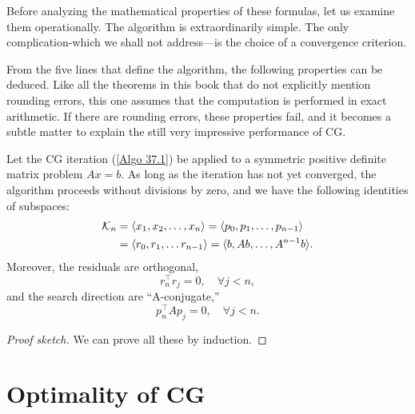 Before analyzing the mathematical properties of these formulas, let us examine them operationally. The algorithm is extraordinarily simple. The only complication-which we shall not address—is the choice of a convergence criterion.

From the five lines that define the algorithm, the following properties can be deduced. Like all the theorems in this book that do not explicitly mention rounding errors, this one assumes that the computation is performed in exact arithmetic. If there are rounding errors, these properties fail, and it becomes a subtle matter to explain the still very impressive performance of CG.


\begin{theorem}
[Properties of CG]
\label{thm: Properties of CG}
Let the CG  iteration (\autoref{Algo 37.1}) be applied to a symmetric positive definite matrix problem $ Ax=b $. As long as the iteration has not yet converged, the algorithm proceeds without divisions by zero, and we have the following identities of subspaces: 
\begin{equation}
\label{eq: subspaces of CG}
    \begin{aligned}
        \mathcal{K}_n &= \langle x_1,x_2,\ldots ,x_n \rangle  = \langle p_0, p_1,\ldots ,p_{n-1} \rangle  \\ 
        &= \langle r_0, r_1,\ldots r_{n-1} \rangle  = \langle b, Ab ,\ldots ,A^{n-1}b \rangle . 
    \end{aligned}
\end{equation}
Moreover, the residuals are orthogonal, 
\begin{equation}
\label{eq: CG orthogonal res}
    r_n^\top r_j = 0, \quad \forall j < n, 
\end{equation}
and the search direction are ``A-conjugate,''
\begin{equation}
\label{eq: A-conjugate CG}
    p_n^\top Ap_j = 0, \quad \forall j< n. 
\end{equation}
\end{theorem}
\begin{proof}[Proof sketch]
We can prove all these by induction. 
\end{proof}

\section{Optimality of CG} 
 

